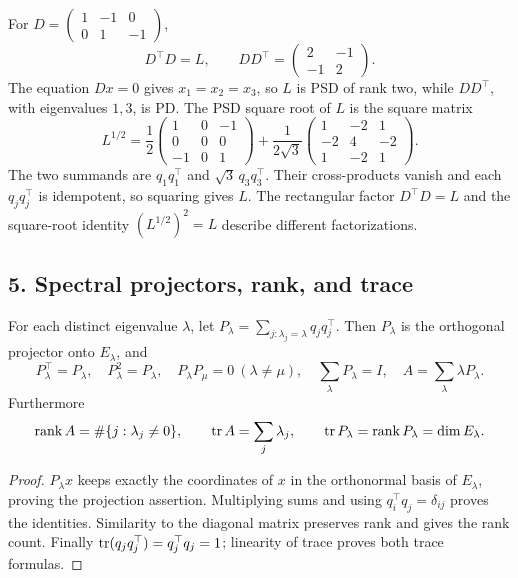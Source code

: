 \begin{example}
For \(D=\begin{pmatrix}1&-1&0\\0&1&-1\end{pmatrix}\),
\[
 D^\top D=L,\qquad DD^\top=\begin{pmatrix}2&-1\\-1&2\end{pmatrix}.
\]
The equation \(Dx=0\) gives \(x_1=x_2=x_3\), so \(L\) is PSD of
rank two, while \(DD^\top\), with eigenvalues \(1,3\), is PD.
The PSD square root of \(L\) is the square matrix
\[
 L^{1/2}
 =\frac12\begin{pmatrix}1&0&-1\\0&0&0\\-1&0&1\end{pmatrix}
  +\frac1{2\sqrt3}\begin{pmatrix}1&-2&1\\-2&4&-2\\1&-2&1\end{pmatrix}.
\]
The two summands are \(q_1q_1^\top\) and
\(\sqrt3\,q_3q_3^\top\). Their cross-products vanish and each
\(q_jq_j^\top\) is idempotent, so squaring gives \(L\).
The rectangular factor \(D^\top D=L\) and the square-root identity
\((L^{1/2})^2=L\) describe different factorizations.
\end{example}

\subsection*{5. Spectral projectors, rank, and trace}
\begin{proposition}
For each distinct eigenvalue \(\lambda\), let
\(P_\lambda=\sum_{j:\lambda_j=\lambda}q_jq_j^\top\).
Then \(P_\lambda\) is the orthogonal projector onto \(E_\lambda\), and
\[
 P_\lambda^\top=P_\lambda,\quad P_\lambda^2=P_\lambda,\quad
 P_\lambda P_\mu=0\ (\lambda\ne\mu),\quad
 \sum_\lambda P_\lambda=I,\quad A=\sum_\lambda\lambda P_\lambda.
\]
Furthermore
\[
 \operatorname{rank}A=\#\{j:\lambda_j\ne0\},\qquad
 \operatorname{tr} A=\sum_j\lambda_j,\qquad
 \operatorname{tr} P_\lambda=\operatorname{rank}P_\lambda=\dim E_\lambda.
\]
\end{proposition}
\begin{proof}
\(P_\lambda x\) keeps exactly the coordinates of \(x\) in the
orthonormal basis of \(E_\lambda\), proving the projection assertion.
Multiplying sums and using \(q_i^\top q_j=\delta_{ij}\) proves the
identities. Similarity to the diagonal matrix preserves rank and gives
the rank count. Finally
\(\operatorname{tr}(q_jq_j^\top)=q_j^\top q_j=1\); linearity of trace proves
both trace formulas.
\end{proof}

